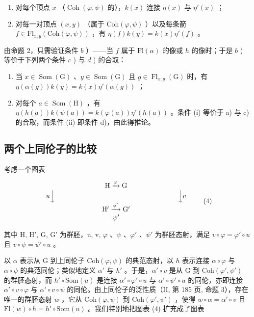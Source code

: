 \begin{enumerate}
\def\labelenumi{\alph{enumi})}
\item
  对每个顶点 \(x\) （\(\operatorname{Coh}(\varphi, \psi)\) 的），\(k(x)\) 连接 \(\eta(x)\) 与 \(\eta'(x)\) ；
\item
  对每一对顶点 \((x,y)\) （属于 \(\mathrm{Coh}(\varphi,\psi)\) ）以及每条箭 \(f\in\mathrm{Fl}_{x,y}(\mathrm{Coh}(\varphi,\psi))\) ，有 \(\eta(f)k(y)=k(x)\eta'(f)\) 。
\end{enumerate}

由命题 2，只需验证条件 \(b\) ）——当 \(f\) 属于 \(\mathrm{Fl}(\alpha)\) 的像或 \(h\) 的像时；于是 \(b\) ) 等价于下列两个条件 \(c\) ) 与 \(d\) ) 的合取：

\begin{enumerate}
\def\labelenumi{\alph{enumi})}
\setcounter{enumi}{2}
\item
  当 \(x \in \operatorname{Som}(\mathrm{G})\) 、\(y \in \operatorname{Som}(\mathrm{G})\) 且 \(g \in \operatorname{Fl}_{x,y}(\mathrm{G})\) 时，有 \(\eta(\alpha(g))k(y) = k(x)\eta'(\alpha(g))\) ；
\item
  对每个 \(a \in \operatorname{Som}(\mathrm{H})\) ，有 \(\eta(h(a))k(\psi(a)) = k(\varphi(a))\eta'(h(a))\) 。条件 (i) 等价于 a) 与 c) 的合取，而条件 (ii) 即条件 d)，由此得推论。
\end{enumerate}

\subsection{两个上同伦子的比较}

考虑一个图表

\[
\begin{array}{c} \mathrm{H} \xrightarrow {\varphi} \mathrm{G} \\ u \Big \downarrow \qquad \qquad \qquad \qquad \qquad \qquad \qquad \qquad \qquad \Big \downarrow v \\ \mathrm{H} ^ {\prime} \xrightarrow {\varphi^ {\prime}} \mathrm{G} ^ {\prime} \\ \psi^ {\prime} \end{array}\tag{4}
\]

其中 H, H', G, G' 为群胚，u, v, \(\varphi\) 、\(\psi\) 、\(\varphi'\) 、\(\psi'\) 为群胚态射，满足 \(v \circ \varphi = \varphi' \circ u\) 且 \(v \circ \psi = \psi' \circ u\) 。

以 \(\alpha\) 表示从 G 到上同伦子 \(\mathrm{Coh}(\varphi, \psi)\) 的典范态射，以 \(h\) 表示连接 \(\alpha \circ \varphi\) 与 \(\alpha \circ \psi\) 的典范同伦；类似地定义 \(\alpha'\) 与 \(h'\) 。于是，\(\alpha' \circ v\) 是从 G 到 \(\mathrm{Coh}(\varphi', \psi')\) 的群胚态射，而 \(h' \circ \mathrm{Som}(u)\) 是连接 \(\alpha' \circ \varphi' \circ u\) 与 \(\alpha' \circ \psi' \circ u\) 的同伦，亦即连接 \(\alpha' \circ v \circ \varphi\) 与 \(\alpha' \circ v \circ \psi\) 的同伦。由上同伦子的泛性质（II, 第 185 页, 命题 3），存在唯一的群胚态射 \(w\) ，它从 \(\mathrm{Coh}(\varphi, \psi)\) 到 \(\mathrm{Coh}(\varphi', \psi')\) ，使得 \(w \circ \alpha = \alpha' \circ v\) 且 \(\mathrm{Fl}(w) \circ h = h' \circ \mathrm{Som}(u)\) 。我们特别地把图表 (4) 扩充成了图表

